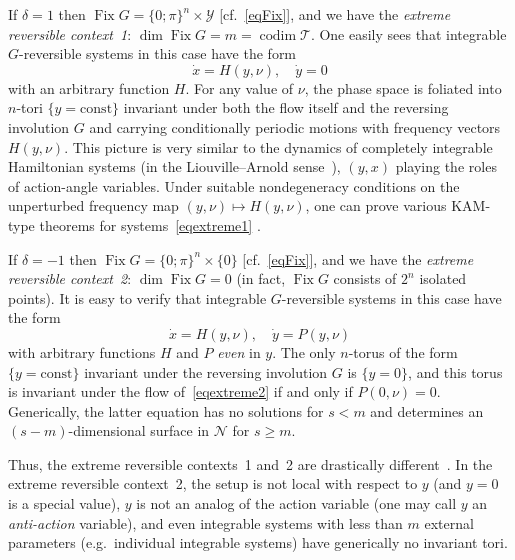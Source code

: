 \documentclass[12pt,reqno]{amsart}
\theoremstyle{definition}
\begin{document}
If $\delta=1$ then $\operatorname{Fix} G=\{0;\pi\}^n\times{\mathcal Y}$ [cf.~\eqref{eqFix}], and we
have the \emph{extreme reversible context~1}: $\dim\operatorname{Fix} G=m=\operatorname{codim}{\mathcal T}$. One
easily sees that integrable $G$-reversible systems in this case have the form
\begin{equation}
\dot{x}=H(y,\nu), \quad \dot{y}=0
\label{eqextreme1}
\end{equation}
with an arbitrary function $H$. For any value of $\nu$, the phase space is
foliated into $n$-tori $\{y={\mathrm{const}}\}$ invariant under both the flow itself and
the reversing involution $G$ and carrying conditionally periodic motions with
frequency vectors $H(y,\nu)$. This picture is very similar to the dynamics of
completely integrable Hamiltonian systems (in the Liouville--Arnold
sense~\cite{AKN06}), $(y,x)$ playing the roles of action-angle variables.
Under suitable nondegeneracy conditions on the unperturbed frequency map
$(y,\nu)\mapsto H(y,\nu)$, one can prove various KAM-type theorems for
systems~\eqref{eqextreme1}
\cite{AS86,BH95,BHS96Gro,BHS96LNM,M67,M73,S86,S95Cha,S98,S06}.

If $\delta=-1$ then $\operatorname{Fix} G=\{0;\pi\}^n\times\{0\}$ [cf.~\eqref{eqFix}], and
we have the \emph{extreme reversible context~2}: $\dim\operatorname{Fix} G=0$ (in fact,
$\operatorname{Fix} G$ consists of $2^n$ isolated points). It is easy to verify that
integrable $G$-reversible systems in this case have the form
\begin{equation}
\dot{x}=H(y,\nu), \quad \dot{y}=P(y,\nu)
\label{eqextreme2}
\end{equation}
with arbitrary functions $H$ and $P$ \emph{even} in $y$. The only $n$-torus of
the form $\{y={\mathrm{const}}\}$ invariant under the reversing involution $G$ is
$\{y=0\}$, and this torus is invariant under the flow of~\eqref{eqextreme2} if
and only if $P(0,\nu)=0$. Generically, the latter equation has no solutions
for $s<m$ and determines an $(s-m)$-dimensional surface in ${\mathcal N}$ for
$s{\geqslant} m$.

Thus, the extreme reversible contexts~1 and~2 are drastically
different~\cite{S11}. In the extreme reversible context~2, the setup is not
local with respect to $y$ (and $y=0$ is a special value), $y$ is not an analog
of the action variable (one may call $y$ an \emph{anti-action} variable), and
even integrable systems with less than $m$ external parameters
(e.g.\ individual integrable systems) have generically no invariant tori.
\end{document}
